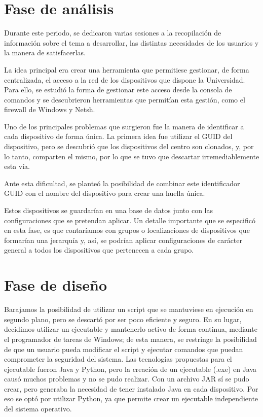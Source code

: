 \section{Fase de análisis}\label{sec:fase-de-analisis}

Durante este periodo, se dedicaron varias sesiones a la recopilación de información sobre el tema a desarrollar, las distintas
necesidades de los usuarios y la manera de satisfacerlas.

La idea principal era crear una herramienta que permitiese gestionar, de forma centralizada, el acceso a la red de
los dispositivos que dispone la Universidad.
Para ello, se estudió la forma de gestionar este acceso desde la consola de comandos y se descubrieron herramientas que
permitían esta gestión, como el firewall de Windows y Netsh.

Uno de los principales problemas que surgieron fue la manera de identificar a cada dispositivo de forma única.
La primera idea fue utilizar el GUID del dispositivo, pero se descubrió que los dispositivos del centro son
clonados, y, por lo tanto, comparten el mismo, por lo que se tuvo que descartar irremediablemente esta vía.

Ante esta dificultad, se planteó la posibilidad de combinar este identificador GUID con el nombre del dispositivo para
crear una huella única.

Estos dispositivos se guardarían en una base de datos junto con las configuraciones que se pretendan aplicar.
Un detalle importante que se especificó en esta fase, es que contaríamos con grupos o localizaciones de dispositivos
que formarían una jerarquía y, así, se podrían aplicar configuraciones de carácter general a todos los dispositivos que
pertenecen a cada grupo.

\section{Fase de diseño}\label{sec:fase-de-diseno}

Barajamos la posibilidad de utilizar un script que se mantuviese en ejecución en segundo plano, pero se
descartó por ser poco eficiente y seguro.
En su lugar, decidimos utilizar un ejecutable y mantenerlo activo de forma continua, mediante el programador de
tareas de Windows; de esta manera, se restringe la posibilidad de que un usuario pueda modificar el script y ejecutar
comandos que puedan comprometer la seguridad del sistema.
Las tecnologías propuestas para el ejecutable fueron Java y Python, pero la creación de un ejecutable (.exe) en Java
causó muchos problemas y no se pudo realizar.
Con un archivo JAR sí se pudo crear, pero generaba la necesidad de tener instalado Java en cada dispositivo.
Por eso se optó por utilizar Python, ya que permite crear un ejecutable independiente del sistema operativo.

